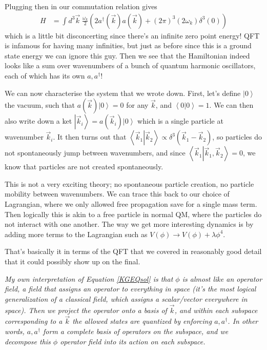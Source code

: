 \documentclass[12pt]{article}
\newcommand{\ket}[1]{\left|#1\right>}
\newcommand{\dotp}[2]{\left<\left.#1\right|#2\right>}
\begin{document}
Plugging then in our commutation relation gives
\begin{align}
    H &= \int d^3\vec{k}\; \frac{\omega_k}{2}\left( 2a^\dagger(\vec{k})a(\vec{k}) + \left( 2\pi \right)^3(2\omega_k)\delta^3(0) \right)
\end{align}
which is a little bit disconcerting since there's an infinite zero point energy! QFT is infamous for having many infinities, but just as before since this is a ground state energy we can ignore this guy. Then we see that the Hamiltonian indeed looks like a sum over wavenumbers of a bunch of quantum harmonic oscillators, each of which has its own $a, a^\dagger$!

We can now characterise the system that we wrote down. First, let's define $\ket{0}$ the vacuum, such that $a(\vec{k})\ket{0} = 0$ for any $\vec{k}$, and $\dotp{0}{0} = 1$. We can then also write down a ket $\ket{\vec{k}_i} = a(\vec{k}_i) \ket{0}$ which is a single particle at wavenumber $\vec{k}_i$. It then turns out that $\dotp{\vec{k}_1}{\vec{k}_2} \propto \delta^3\left( \vec{k}_1 - \vec{k}_2 \right)$, so particles do not spontaneously jump between wavenumbers, and since $\dotp{\vec{k}_1}{\vec{k}_1, \vec{k}_2} = 0$, we know that particles are not created spontaneously.

This is not a very exciting theory; no spontaneous particle creation, no particle mobility between wavenumbers. We can trace this back to our choice of Lagrangian, where we only allowed free propagation save for a single mass term. Then logically this is akin to a free particle in normal QM, where the particles do not interact with one another. The way we get more interesting dynamics is by adding more terms to the Lagrangian such as $V(\phi) \to V(\phi) +  \lambda \phi^4$.

That's basically it in terms of the QFT that we covered in reasonably good detail that it could possibly show up on the final. 

{\em \small My own interpretation of Equation \eqref{KGEQsol} is that $\phi$ is almost like an operator field, a field that assigns an operator to everything in space (it's the most logical generalization of a classical field, which assigns a scalar/vector everywhere in space). Then we project the operator onto a basis of $\vec{k}$, and within each subspace corresponding to a $\vec{k}$ the allowed states are quantized by enforcing $a, a^\dagger$. In other words, $a, a^\dagger$ form a complete basis of operators on the subspace, and we decompose this $\phi$ operator field into its action on each subspace.}
\end{document}
